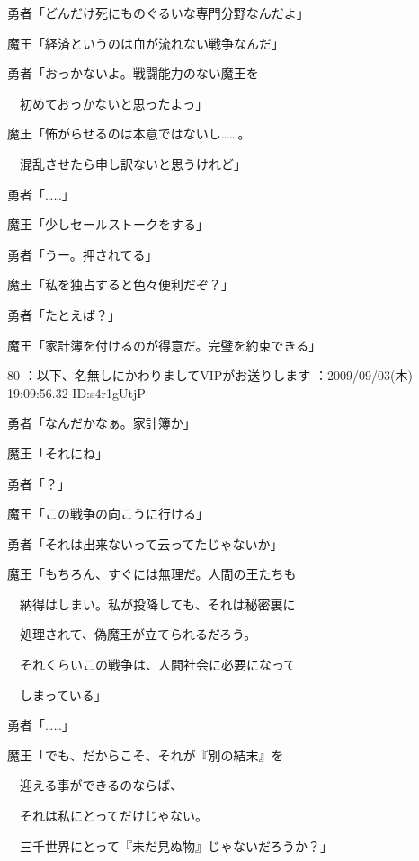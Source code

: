 \documentclass[a4j,twocolumn]{tarticle}
\begin{document}
勇者「どんだけ死にものぐるいな専門分野なんだよ」\par{} 
魔王「経済というのは血が流れない戦争なんだ」 



勇者「おっかないよ。戦闘能力のない魔王を\par{} 
　初めておっかないと思ったよっ」\par{} 
魔王「怖がらせるのは本意ではないし……。\par{} 
　混乱させたら申し訳ないと思うけれど」 



勇者「……」 



魔王「少しセールストークをする」\par{} 
勇者「うー。押されてる」 



魔王「私を独占すると色々便利だぞ？」\par{} 
勇者「たとえば？」 



魔王「家計簿を付けるのが得意だ。完璧を約束できる」 

	

	

80 ：以下、名無しにかわりましてVIPがお送りします ：2009/09/03(木) 19:09:56.32 ID:s4r1gUtjP


勇者「なんだかなぁ。家計簿か」\par{} 
魔王「それにね」\par{} 
勇者「？」 



魔王「この戦争の向こうに行ける」\par{} 
勇者「それは出来ないって云ってたじゃないか」 



魔王「もちろん、すぐには無理だ。人間の王たちも\par{} 
　納得はしまい。私が投降しても、それは秘密裏に\par{} 
　処理されて、偽魔王が立てられるだろう。\par{} 
　それくらいこの戦争は、人間社会に必要になって\par{} 
　しまっている」 



勇者「……」 



魔王「でも、だからこそ、それが『別の結末』を\par{} 
　迎える事ができるのならば、\par{} 
　それは私にとってだけじゃない。\par{} 
　三千世界にとって『未だ見ぬ物』じゃないだろうか？」 
\end{document}
